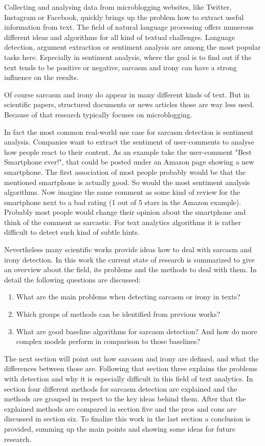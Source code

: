\documentclass[sigconf,  review=false, nonacm=true]{acmart}
\begin{document}
Collecting and analysing data from microblogging websites, like Twitter, Instagram or Facebook, quickly brings up the problem how to extract useful information from text. The field of natural language processing offers numerous different ideas and algorithms for all kind of textual challenges. Language detection, argument extraction or sentiment analysis are among the most popular tasks here. Especially in sentiment analysis, where the goal is to find out if the text tends to be positive or negative, sarcasm and irony can have a strong influence on the results.  

Of course sarcasm and irony do appear in many different kinds of text. But in scientific papers, structured documents or news articles those are way less used. Because of that research typically focuses on microblogging.

In fact the most common real-world use case for sarcasm detection is sentiment analysis. Companies want to extract the sentiment of user-comments to analyse how people react to their content. As an example take the user-comment "Best Smartphone ever!", that could be posted under an Amazon page showing a new smartphone. The first association of most people probably would be that the mentioned smartphone is actually good. So would the most sentiment analysis algorithms. Now imagine the same comment as some kind of review for the smartphone next to a bad rating (1 out of 5 stars in the Amazon example). Probably most people would change their opinion about the smartphone and think of the comment as sarcastic. For text analytics algorithms it is rather difficult to detect such kind of subtle hints.

Nevertheless many scientific works provide ideas how to deal with sarcasm and irony detection. In this work the current state of research is summarized to give an overview about the field, its problems and the methods to deal with them. In detail the following questions are discussed:
\begin{enumerate} 
	\item What are the main problems when detecting sarcasm or irony in texts?
	\item Which groups of methods can be identified from previous works?
	\item What are good baseline algorithms for sarcasm detection? And how do more complex models perform in comparison to those baselines?
\end{enumerate}


The next section will point out how sarcasm and irony are defined, and what the differences between those are. Following that section three explains the problems with detection and why it is especially difficult in this field of text analytics. In section four different methods for sarcasm detection are explained and the methods are grouped in respect to the key ideas behind them. After that the explained methods are compared in section five and the pros and cons are discussed in section six. To finalize this work in the last section a conclusion is provided, summing up the main points and showing some ideas for future research.
\end{document}
